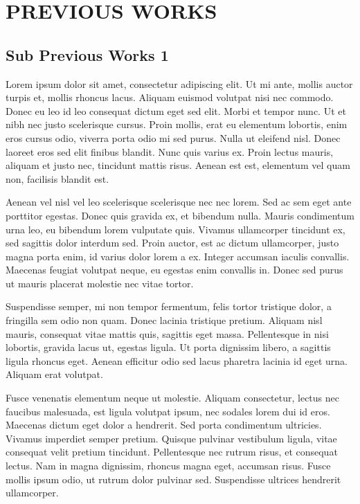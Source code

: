 \chapter{PREVIOUS WORKS}

\section{Sub Previous Works 1}
Lorem ipsum dolor sit amet, consectetur adipiscing elit. Ut mi ante, mollis auctor turpis et, mollis rhoncus lacus. Aliquam euismod volutpat nisi nec commodo. Donec eu leo id leo consequat dictum eget sed elit. Morbi et tempor nunc. Ut et nibh nec justo scelerisque cursus. Proin mollis, erat eu elementum lobortis, enim eros cursus odio, viverra porta odio mi sed purus. Nulla ut eleifend nisl. Donec laoreet eros sed elit finibus blandit. Nunc quis varius ex. Proin lectus mauris, aliquam et justo nec, tincidunt mattis risus. Aenean est est, elementum vel quam non, facilisis blandit est.

Aenean vel nisl vel leo scelerisque scelerisque nec nec lorem. Sed ac sem eget ante porttitor egestas. Donec quis gravida ex, et bibendum nulla. Mauris condimentum urna leo, eu bibendum lorem vulputate quis. Vivamus ullamcorper tincidunt ex, sed sagittis dolor interdum sed. Proin auctor, est ac dictum ullamcorper, justo magna porta enim, id varius dolor lorem a ex. Integer accumsan iaculis convallis. Maecenas feugiat volutpat neque, eu egestas enim convallis in. Donec sed purus ut mauris placerat molestie nec vitae tortor.

Suspendisse semper, mi non tempor fermentum, felis tortor tristique dolor, a fringilla sem odio non quam. Donec lacinia tristique pretium. Aliquam nisl mauris, consequat vitae mattis quis, sagittis eget massa. Pellentesque in nisi lobortis, gravida lacus ut, egestas ligula. Ut porta dignissim libero, a sagittis ligula rhoncus eget. Aenean efficitur odio sed lacus pharetra lacinia id eget urna. Aliquam erat volutpat.

Fusce venenatis elementum neque ut molestie. Aliquam consectetur, lectus nec faucibus malesuada, est ligula volutpat ipsum, nec sodales lorem dui id eros. Maecenas dictum eget dolor a hendrerit. Sed porta condimentum ultricies. Vivamus imperdiet semper pretium. Quisque pulvinar vestibulum ligula, vitae consequat velit pretium tincidunt. Pellentesque nec rutrum risus, et consequat lectus. Nam in magna dignissim, rhoncus magna eget, accumsan risus. Fusce mollis ipsum odio, ut rutrum dolor pulvinar sed. Suspendisse ultrices hendrerit ullamcorper.

